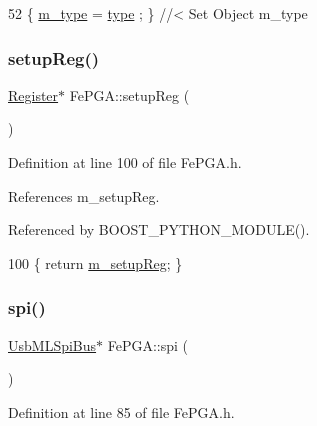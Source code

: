 \begin{DoxyCode}
52 \{ \hyperlink{classObject_a457a600fe8c00eb1034374f75110a78c}{m\_type}  = \hyperlink{classObject_a84f99f70f144a83e1582d1d0f84e4e62}{type}  ; \} \textcolor{comment}{//< Set Object m\_type}
\end{DoxyCode}
\mbox{\label{classFePGA_aa0657c6ef809f3f6b54613f237750cc4}} 
\subsubsection{\texorpdfstring{setup\+Reg()}{setupReg()}}
{\footnotesize\ttfamily \hyperlink{classRegister}{Register}$\ast$ Fe\+P\+G\+A\+::setup\+Reg (\begin{DoxyParamCaption}{ }\end{DoxyParamCaption})\hspace{0.3cm}{\ttfamily [inline]}}



Definition at line 100 of file Fe\+P\+G\+A.\+h.



References m\+\_\+setup\+Reg.



Referenced by B\+O\+O\+S\+T\+\_\+\+P\+Y\+T\+H\+O\+N\+\_\+\+M\+O\+D\+U\+L\+E().


\begin{DoxyCode}
100 \{ \textcolor{keywordflow}{return} \hyperlink{classFePGA_a0255fe229013986b4387c3a75ddf4e97}{m\_setupReg};  \}
\end{DoxyCode}
\mbox{\label{classFePGA_ab54f9f61e87f1cced6c4ba19eb38a848}} 
\subsubsection{\texorpdfstring{spi()}{spi()}}
{\footnotesize\ttfamily \hyperlink{classUsbMLSpiBus}{Usb\+M\+L\+Spi\+Bus}$\ast$ Fe\+P\+G\+A\+::spi (\begin{DoxyParamCaption}{ }\end{DoxyParamCaption})\hspace{0.3cm}{\ttfamily [inline]}}



Definition at line 85 of file Fe\+P\+G\+A.\+h.



